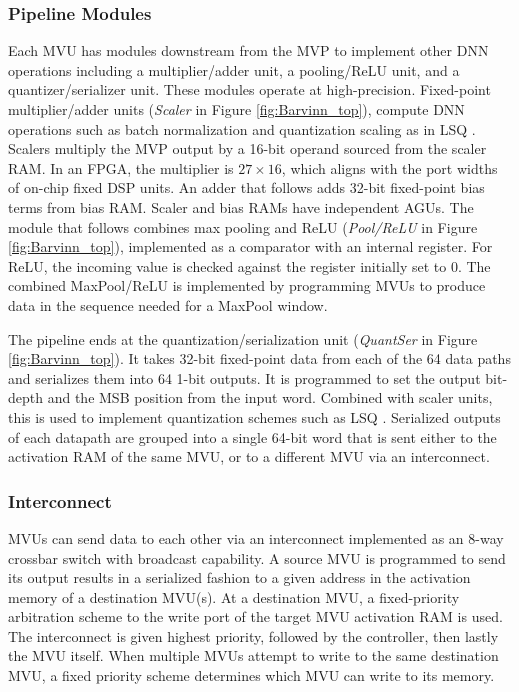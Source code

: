 \documentclass[sigconf]{acmart}
\newcommand{\MVU}{MVU}
\begin{document}
\subsubsection{Pipeline Modules}
\label{sec:Pipeline Modules}
Each \MVU{} has modules downstream from the MVP to implement other DNN operations including a multiplier/adder unit, a pooling/ReLU unit, and a quantizer/serializer unit. These modules operate at high-precision. Fixed-point multiplier/adder units (\emph{Scaler} in Figure \ref{fig:Barvinn_top}), compute DNN operations such as batch normalization and quantization scaling as in LSQ \cite{Esser2020LEARNED}. Scalers multiply the MVP output by a 16-bit operand sourced 
from the scaler RAM. In an FPGA, the multiplier is $27\times16$, which aligns with the port widths of on-chip fixed DSP units. An adder that follows adds 32-bit fixed-point bias terms from bias RAM. Scaler and bias RAMs have independent AGUs. The module that follows combines max pooling and ReLU (\emph{Pool/ReLU} in Figure \ref{fig:Barvinn_top}), implemented as a comparator with an internal register. For ReLU, the incoming value is checked against the register initially set to 0. The combined MaxPool/ReLU is implemented by programming  \MVU s to produce data in the sequence needed for a MaxPool window.

The pipeline ends at the quantization/serialization unit (\emph{QuantSer} in Figure \ref{fig:Barvinn_top}). It takes 32-bit fixed-point data from each of the 64 data paths and serializes them into 64 1-bit outputs. It is programmed to set the output bit-depth and the MSB position from the input word. Combined with scaler units, this is used to implement quantization schemes such as LSQ \cite{Esser2020LEARNED}. Serialized outputs of each datapath are grouped into a single 64-bit word that is sent either to the activation RAM of the same \MVU{}, or to a different \MVU{} via an interconnect.

\subsubsection{Interconnect}

\MVU{}s can send data to each other via an interconnect implemented as an 8-way crossbar switch with broadcast capability. A source \MVU{} is programmed to send its output results in a serialized fashion to a given address in the activation memory of a destination \MVU{}(s). At a destination \MVU{}, a fixed-priority arbitration scheme to the write port of the target MVU activation RAM is used. The interconnect is given highest priority, followed by the controller, then lastly the \MVU{} itself. When multiple \MVU{}s attempt to write to the same destination \MVU{}, a fixed priority scheme determines which \MVU{} can write to its memory.
\end{document}
